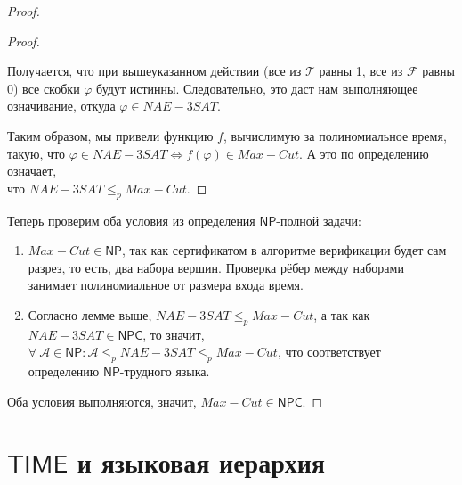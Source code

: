 \documentclass[a4paper,12pt]{article}
\newcommand{\NPclass}{\mathsf{NP}}
\newcommand{\NPCclass}{\mathsf{NPC}}
\newcommand{\Time}{\mathsf{TIME}}
\begin{document}
\begin{proof}
\begin{proof}
\begin{itemize}
            Получается, что при вышеуказанном действии (все из $\mathcal{T}$ равны 1, все из $\mathcal{F}$ равны 0) все скобки $\varphi$ будут истинны. Следовательно, это даст нам выполняющее означивание, откуда $\varphi \in NAE-3SAT$.
        \end{itemize}
        Таким образом, мы привели функцию $f$, вычислимую за полиномиальное время, такую, что $\varphi \in NAE-3SAT \Longleftrightarrow f(\varphi) \in Max-Cut$. А это по определению означает,\\ что $NAE-3SAT \leqslant_p Max-Cut$.
    \end{proof}
    Теперь проверим оба условия из определения $\NPclass$-полной задачи:
    \begin{enumerate}
        \item $Max-Cut \in \NPclass$, так как сертификатом в алгоритме верификации будет сам разрез, то есть, два набора вершин. Проверка рёбер между наборами занимает полиномиальное от размера входа время.
        \item Согласно лемме выше, $NAE-3SAT \leqslant_p Max-Cut$, а так как $NAE-3SAT \in \NPCclass$, то значит, $\forall\ \mathscr{A} \in \NPclass: \mathscr{A} \leqslant_p NAE-3SAT \leqslant_p Max-Cut$, что соответствует определению $\NPclass$-трудного языка.
    \end{enumerate}
    Оба условия выполняются, значит, $Max-Cut \in \NPCclass$.
\end{proof}

\newpage
\section{\(\Time\) и языковая иерархия}
\end{document}
